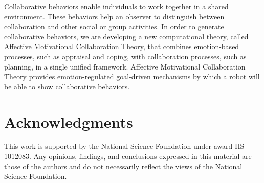 \documentclass[letterpaper]{article}
\begin{document}
Collaborative behaviors enable individuals to work together in a shared
environment. These behaviors help an observer to distinguish between
collaboration and other social or group activities. In order to generate
collaborative behaviors, we are developing a new computational theory, called
Affective Motivational Collaboration Theory, that combines emotion-based
processes, such as appraisal and coping, with collaboration processes, such as
planning, in a single unified framework. Affective Motivational Collaboration
Theory provides emotion-regulated goal-driven mechanisms by which a robot will
be able to show collaborative behaviors.

\section*{Acknowledgments}
{\fontsize{8.2}{9}\selectfont This work is supported by the National Science
Foundation under award IIS-1012083. Any opinions, findings, and conclusions
expressed in this material are those of the authors and do not necessarily
reflect the views of the National Science Foundation.}



\end{document}
